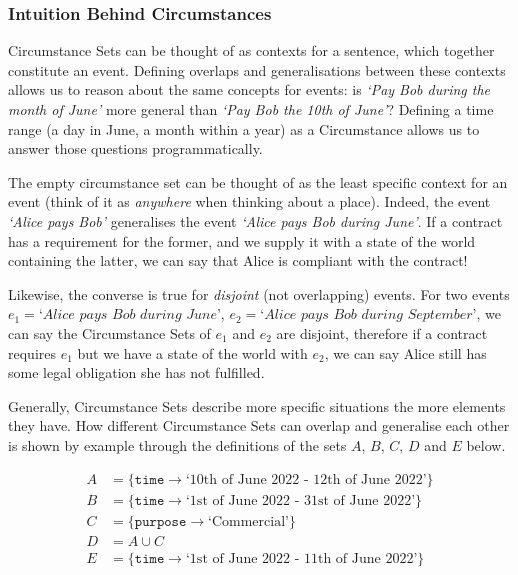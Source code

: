 \subsubsection{Intuition Behind Circumstances}\label{subsubsec:circumstances-intuition}

Circumstance Sets can be thought of as contexts for a sentence, which together constitute an event.
Defining overlaps and generalisations between these contexts allows us to reason about the same concepts for events: is \emph{`Pay Bob during the month of June'} more general than \emph{`Pay Bob the 10th of June'}? Defining a time range (a day in June, a month within a year) as a Circumstance allows us to answer those questions programmatically.

The empty circumstance set can be thought of as the least specific context for an event (think of it as \emph{anywhere} when thinking about a place).
Indeed, the event \emph{`Alice pays Bob'} generalises the event \emph{`Alice pays Bob during June'}.
If a contract has a requirement for the former, and we supply it with a state of the world containing the latter, we can say that Alice is compliant with the contract!

Likewise, the converse is true for \emph{disjoint} (not overlapping) events.
For two events $e_1 = \textit{`Alice pays Bob during June'}$,  $e_2 = \textit{`Alice pays Bob during September'}$, we can say the Circumstance Sets of $e_1$ and $e_2$ are disjoint, therefore if a contract requires $e_1$ but we have a state of the world with $e_2$, we can say Alice still has some legal obligation she has not fulfilled.

Generally, Circumstance Sets describe more specific situations the more elements they have.
How different Circumstance Sets can overlap and generalise each other is shown by example through the definitions of the sets $A$, $B$, $C$, $D$ and $E$ below.

\begin{align}
    A &= \{ \texttt{time} \to \text{`10th of June 2022 - 12th of June 2022'} \}\\
    B &= \{ \texttt{time} \to \text{`1st of June 2022 - 31st of June 2022'} \}\\
    C &= \{ \texttt{purpose} \to \text{`Commercial'} \}\\
    D &= A \cup C\\
    E &= \{ \texttt{time} \to \text{`1st of June 2022 - 11th of June 2022'} \}
\end{align}

